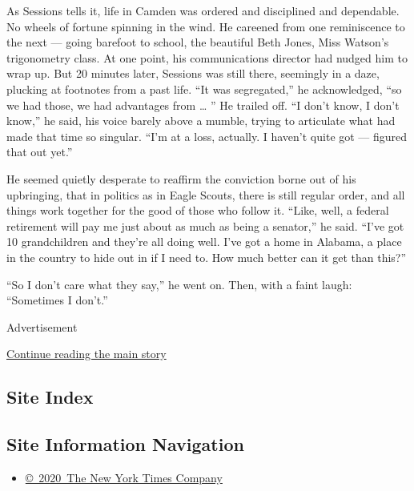 As Sessions tells it, life in Camden was ordered and disciplined and
dependable. No wheels of fortune spinning in the wind. He careened from
one reminiscence to the next --- going barefoot to school, the beautiful
Beth Jones, Miss Watson's trigonometry class. At one point, his
communications director had nudged him to wrap up. But 20 minutes later,
Sessions was still there, seemingly in a daze, plucking at footnotes
from a past life. ``It was segregated,'' he acknowledged, ``so we had
those, we had advantages from \ldots{} '' He trailed off. ``I don't
know, I don't know,'' he said, his voice barely above a mumble, trying
to articulate what had made that time so singular. ``I'm at a loss,
actually. I haven't quite got --- figured that out yet.''

He seemed quietly desperate to reaffirm the conviction borne out of his
upbringing, that in politics as in Eagle Scouts, there is still regular
order, and all things work together for the good of those who follow it.
``Like, well, a federal retirement will pay me just about as much as
being a senator,'' he said. ``I've got 10 grandchildren and they're all
doing well. I've got a home in Alabama, a place in the country to hide
out in if I need to. How much better can it get than this?''

``So I don't care what they say,'' he went on. Then, with a faint laugh:
``Sometimes I don't.''

Advertisement

\protect\hyperlink{after-bottom}{Continue reading the main story}

\hypertarget{site-index}{%
\subsection{Site Index}\label{site-index}}

\hypertarget{site-information-navigation}{%
\subsection{Site Information
Navigation}\label{site-information-navigation}}

\begin{itemize}
\tightlist
\item
  \href{https://help.nytimes3xbfgragh.onion/hc/en-us/articles/115014792127-Copyright-notice}{©~2020~The
  New York Times Company}
\end{itemize}

